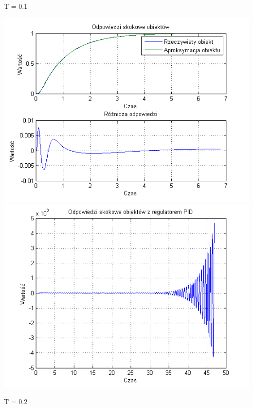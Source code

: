 \documentclass[10pt,a4paper]{article}
\begin{document}
T = 0.1
\begin{center}
\includegraphics[scale=1]{images/dwa/skrypt_247.png}\\
\includegraphics[scale=1]{images/dwa/skrypt_248.png}\\
\end{center}
\newpage
T = 0.2
\end{document}
